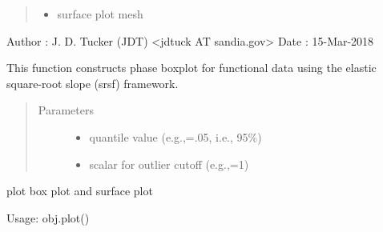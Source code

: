 \documentclass[letterpaper,10pt,english]{sphinxmanual}
\begin{document}
\begin{fulllineitems}
\begin{quote}
\begin{description}
\begin{itemize}
\item {} 
 \textendash{} surface plot mesh

\end{itemize}

\end{description}\end{quote}

Author :  J. D. Tucker (JDT) \textless{}jdtuck AT sandia.gov\textgreater{}
Date   :  15-Mar-2018

\begin{fulllineitems}
\label{\detokenize{boxplots:boxplots.phbox.construct_boxplot}}
This function constructs phase boxplot for functional data using the elastic
square-root slope (srsf) framework.
\begin{quote}\begin{description}
\item[{Parameters}] \leavevmode\begin{itemize}
\item {} 
 \textendash{} quantile value (e.g.,=.05, i.e., 95\%)

\item {} 
 \textendash{} scalar for outlier cutoff (e.g.,=1)

\end{itemize}

\end{description}\end{quote}

\end{fulllineitems}


\begin{fulllineitems}
\label{\detokenize{boxplots:boxplots.phbox.plot}}
plot box plot and surface plot

Usage: obj.plot()

\end{fulllineitems}


\end{fulllineitems}
\end{document}
